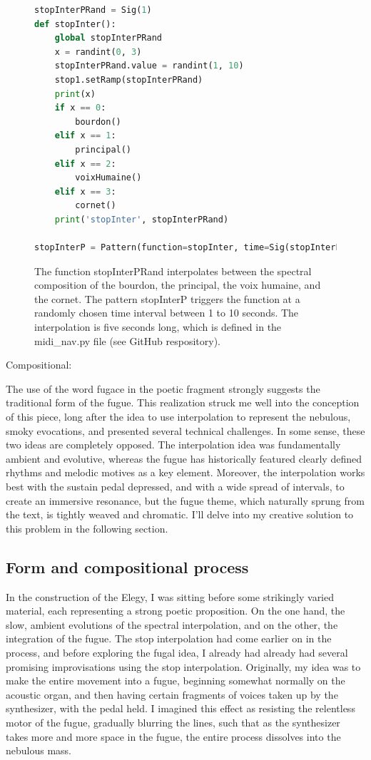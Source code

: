 \documentclass[12pt,twoside,maitrise]{dms_ks}
\theoremstyle{definition}
\begin{document}
{\begin{figure}[H]
\begin{lstlisting}[language=Python]
stopInterPRand = Sig(1)
def stopInter():
    global stopInterPRand
    x = randint(0, 3)
    stopInterPRand.value = randint(1, 10)
    stop1.setRamp(stopInterPRand)
    print(x)
    if x == 0:
        bourdon()
    elif x == 1:
        principal()
    elif x == 2:
        voixHumaine()
    elif x == 3:
        cornet()
    print('stopInter', stopInterPRand)

stopInterP = Pattern(function=stopInter, time=Sig(stopInterPRand))
\end{lstlisting}
\caption{The function stopInterPRand interpolates between the spectral composition of the bourdon, the principal, the voix humaine, and the cornet.
The pattern stopInterP triggers the function at a randomly chosen time interval between 1 to 10 seconds.
The interpolation is five seconds long, which is defined in the midi\_nav.py file (see GitHub respository).}
\end{figure}

Compositional:

The use of the word fugace in the poetic fragment strongly suggests the traditional form of the fugue. This realization struck me well into the conception of this piece, long after the idea to use interpolation to represent the nebulous, smoky evocations, and presented several technical challenges. In some sense, these two ideas are completely opposed. The interpolation idea was fundamentally ambient and evolutive, whereas the fugue has historically featured clearly defined rhythms and melodic motives as a key element. Moreover, the interpolation works best with the sustain pedal depressed, and with a wide spread of intervals, to create an immersive resonance, but the fugue theme, which naturally sprung from the text, is tightly weaved and chromatic. I'll delve into my creative solution to this problem in the following section.

\subsection{Form and compositional process}

In the construction of the Elegy, I was sitting before some strikingly varied material, each representing a strong poetic proposition. On the one hand, the slow, ambient evolutions of the spectral interpolation, and on the other, the integration of the fugue. The stop interpolation had come earlier on in the process, and before exploring the fugal idea, I already had already had several promising improvisations using the stop interpolation. Originally, my idea was to make the entire movement into a fugue, beginning somewhat normally on the acoustic organ, and then having certain fragments of voices taken up by the synthesizer, with the pedal held. I imagined this effect as resisting the relentless motor of the fugue, gradually blurring the lines, such that as the synthesizer takes more and more space in the fugue, the entire process dissolves into the nebulous mass.

}
\end{document}
